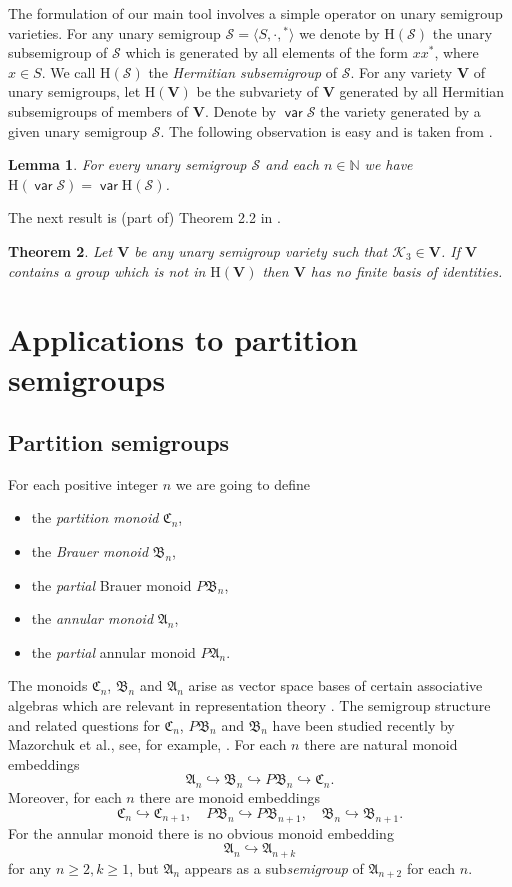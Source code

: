 \documentclass[11pt,reqno]{amsart}
\DeclareMathOperator{\var}{\mathsf{var}}
\numberwithin{equation}{section}
\def\bb{\mathbb}
\newtheorem{Thm}{Theorem}[section]
\newtheorem{Lemma}[Thm]{Lemma}
\theoremstyle{remark}
\def\cal{\mathcal}
\def\Sc{{\cal S}}
\def\Vc{\mathbf{V}}
\def\H{\mathrm H}
\def\A{\mathfrak{A}}
\def\C{\mathfrak{C}}
\def\B{\mathfrak{B}}
\begin{document}
The formulation of our main tool involves a simple
operator on unary semigroup varieties. For any unary semigroup
$\mathcal{S}=\langle S,\cdot,{}^*\rangle$ we denote by
$\H(\mathcal{S})$ the unary subsemigroup of $\mathcal{S}$ which is
generated by all elements of the form $xx^*$, where $x\in S$. We
call $\H(\mathcal{S})$ the \emph{Hermitian subsemigroup} of
$\mathcal{S}$. For any variety $\Vc$ of unary semigroups, let
$\H(\Vc)$ be the subvariety of $\Vc$ generated by all Hermitian
subsemigroups of members of $\Vc$.
Denote by $\var\Sc$ the variety generated by a given unary
semigroup $\Sc$. The following observation is easy and is taken from \cite[Lemma 2.1]{adv}.

\begin{Lemma}\label{Lemma 3.1} For every unary semigroup $\Sc$ and each $n\in \bb N$ we have
$\H(\var\Sc)=\var\H(\Sc)$.
\end{Lemma}

The next result is (part of) Theorem 2.2  in \cite{adv}.

\begin{Thm}\label{Theorem 2.1}
Let $\Vc$ be any unary semigroup variety such that
$\mathcal{K}_3\in\Vc$. If  $\Vc$ contains a group which is not in $\H(\Vc)$
then $\Vc$ has no finite basis of identities.
\end{Thm}



\section{Applications to partition semigroups}
\subsection{Partition semigroups}
For each positive integer $n$ we are going to define
\begin{itemize}
\item the \emph{partition monoid} $\C_n$,
\item the \emph{Brauer monoid} $\B_n$,
\item the \emph{partial} Brauer monoid $P\B_n$,
\item the \emph{annular monoid} $\A_n$,
\item the \emph{partial} annular monoid $P\A_n$.
\end{itemize}
The monoids $\C_n$, $\B_n$ and $\A_n$ arise as vector space bases
of certain associative algebras which are relevant in
representation theory \cite{brauer, xi, jones, grahamlehrer}. The
semigroup structure and related questions for $\C_n$, $P\B_n$ and
$\B_n$ have been studied recently by Mazorchuk et al., see, for
example, \cite{Maz1, Maz2, KMM, KM2,malcevmazorchuk}. For each $n$
there are natural monoid embeddings
$$\A_n\hookrightarrow\B_n\hookrightarrow P\B_n\hookrightarrow \C_n.$$
Moreover, for each $n$ there are monoid embeddings
$$\C_n\hookrightarrow\C_{n+1},\quad P\B_n\hookrightarrow
P\B_{n+1},\quad \B_n\hookrightarrow\B_{n+1}.$$ For the annular
monoid there is no obvious monoid embedding
$$\A_n\hookrightarrow\A_{n+k}$$
for any $n\ge 2,k\ge 1$, but $\A_n$ appears as a
sub\emph{semigroup} of $\A_{n+2}$ for each $n$.
\end{document}
